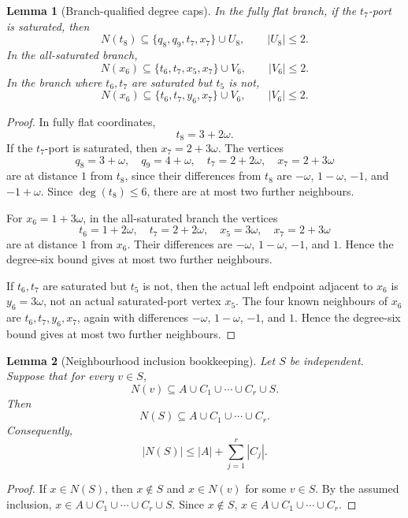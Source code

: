 \documentclass[11pt]{article}
\newtheorem{lemma}{Lemma}
\begin{document}
\begin{lemma}[Branch-qualified degree caps]\label{lem:degree-caps}
In the fully flat branch, if the $t_7$-port is saturated, then
\[
  N(t_8)\subseteq \{q_8,q_9,t_7,x_7\}\cup U_8,
  \qquad |U_8|\le2.
\]
In the all-saturated branch,
\[
  N(x_6)\subseteq \{t_6,t_7,x_5,x_7\}\cup V_6,
  \qquad |V_6|\le2.
\]
In the branch where $t_6,t_7$ are saturated but $t_5$ is not,
\[
  N(x_6)\subseteq \{t_6,t_7,y_6,x_7\}\cup V_6,
  \qquad |V_6|\le2.
\]
\end{lemma}

\begin{proof}
In fully flat coordinates,
\[
  t_8=3+2\omega.
\]
If the $t_7$-port is saturated, then $x_7=2+3\omega$. The vertices
\[
  q_8=3+\omega,
  \quad q_9=4+\omega,
  \quad t_7=2+2\omega,
  \quad x_7=2+3\omega
\]
are at distance $1$ from $t_8$, since their differences from $t_8$ are $-\omega$, $1-\omega$, $-1$, and $-1+\omega$.  Since $\deg(t_8)\le6$, there are at most two further neighbours.

For $x_6=1+3\omega$, in the all-saturated branch the vertices
\[
  t_6=1+2\omega,
  \quad t_7=2+2\omega,
  \quad x_5=3\omega,
  \quad x_7=2+3\omega
\]
are at distance $1$ from $x_6$. Their differences are $-\omega$, $1-\omega$, $-1$, and $1$. Hence the degree-six bound gives at most two further neighbours.

If $t_6,t_7$ are saturated but $t_5$ is not, then the actual left endpoint adjacent to $x_6$ is $y_6=3\omega$, not an actual saturated-port vertex $x_5$. The four known neighbours of $x_6$ are $t_6,t_7,y_6,x_7$, again with differences $-\omega$, $1-\omega$, $-1$, and $1$. Hence the degree-six bound gives at most two further neighbours.
\end{proof}

\begin{lemma}[Neighbourhood inclusion bookkeeping]\label{lem:inclusion}
Let $S$ be independent. Suppose that for every $v\in S$,
\[
  N(v)\subseteq A\cup C_1\cup\cdots\cup C_r\cup S.
\]
Then
\[
  N(S)\subseteq A\cup C_1\cup\cdots\cup C_r.
\]
Consequently,
\[
  |N(S)|\le |A|+\sum_{j=1}^{r}|C_j|.
\]
\end{lemma}

\begin{proof}
If $x\in N(S)$, then $x\notin S$ and $x\in N(v)$ for some $v\in S$.  By the assumed inclusion, $x\in A\cup C_1\cup\cdots\cup C_r\cup S$. Since $x\notin S$, $x\in A\cup C_1\cup\cdots\cup C_r$.
\end{proof}
\end{document}
